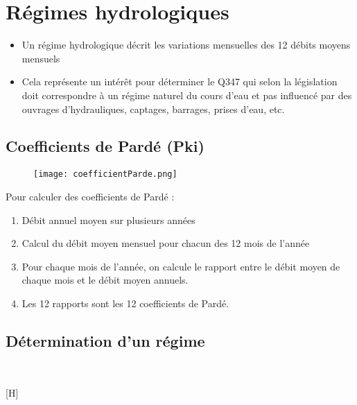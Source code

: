 \section{Régimes hydrologiques}
\begin{itemize}
    \item Un régime hydrologique décrit les variations mensuelles des 12 débits moyens mensuels
    \item Cela représente un intérêt pour déterminer le Q347 qui selon la législation doit correspondre à un régime naturel du cours d'eau et pas influencé par des ouvrages d'hydrauliques, captages, barrages, prises d'eau, etc.
\end{itemize}

\subsection{Coefficients de Pardé (Pki)}
\begin{figure}[H]
    \centering
    \texttt{[image: coefficientParde.png]}
\end{figure}
Pour calculer des coefficients de Pardé :
\begin{enumerate}
    \item Débit annuel moyen sur plusieurs années
    \item Calcul du débit moyen mensuel pour chacun des 12 mois de l'année
    \item Pour chaque mois de l'année, on calcule le rapport entre le débit moyen de chaque mois et le débit moyen annuels.
    \item Les 12 rapports sont les 12 coefficients de Pardé.
\end{enumerate}

\subsection{Détermination d'un régime}
\begin{figure}[H]
    \centering
     \\
\end{figure}[H]
\begin{figure}[H]
     \\
     \\
\end{figure}

